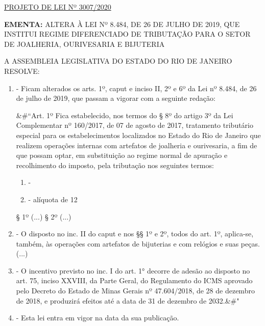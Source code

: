 \documentclass[10pt]{article}
\date{}
\begin{document}
\maketitle
\begin{center}
  \huge
  \vspace{-3cm}\href{http://alerjln1.alerj.rj.gov.br/scpro1923.nsf/f4b46b3cdbba990083256cc900746cf6/14c84b54c826700a032585c8005ca096?OpenDocument}{PROJETO DE LEI Nº 3007/2020}
\bigskip
\bigskip
\bigskip
  
\end{center}

\textbf{EMENTA:} 
ALTERA À LEI Nº 8.484, DE 26 DE JULHO DE 2019, QUE INSTITUI REGIME DIFERENCIADO DE TRIBUTAÇÃO PARA O SETOR DE JOALHERIA, OURIVESARIA E BIJUTERIA








\bigskip

\noindent
A ASSEMBLEIA LEGISLATIVA DO ESTADO DO RIO DE JANEIRO RESOLVE:

\begin{enumerate}[label=Art. \arabic*\textdegree]
\item - Ficam alterados os arts. 1º, caput e inciso II, 2º e 6º da Lei nº 8.484, de 26 de julho de 2019, que passam a vigorar com a seguinte redação:

&#``Art. 1º Fica estabelecido, nos termos do § 8º do artigo 3º da Lei Complementar nº 160/2017, de 07 de agosto de 2017, tratamento tributário especial para os  estabelecimentos localizados no Estado do Rio de Janeiro que realizem operações internas com artefatos de joalheria e ourivesaria, a fim de que possam optar, em substituição ao regime normal de apuração e recolhimento do imposto, pela tributação nos seguintes termos:
\begin{enumerate}[label=\Roman*]
\item - 
\item - alíquota de 12%
\end{enumerate}
§ 1º (...)
§ 2º (...)
\item - O disposto no inc. II do caput e nos §§ 1º e 2º, todos do art. 1º, aplica-se, também, às operações com artefatos de bijuterias e com relógios e suas peças.
(...)
\item - O incentivo previsto no inc. I do art. 1° decorre de adesão ao disposto no art. 75, inciso XXVIII, da Parte Geral, do Regulamento do ICMS aprovado pelo Decreto do Estado de Minas Gerais nº 47.604/2018, de 28 de dezembro de 2018, e produzirá efeitos até a data de 31 de dezembro de 2032.&#"


\item - Esta lei entra em vigor na data da sua publicação.


\end{enumerate}
\end{document}
